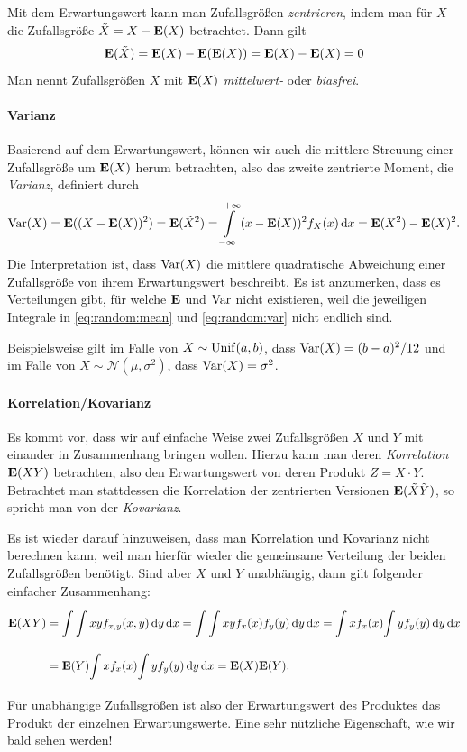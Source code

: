 Mit dem Erwartungswert kann man Zufallsgrößen \emph{zentrieren}, indem man für $X$ die Zufallsgröße $\tilde{X} = X - \bm{\mathrm{E}}(X)$ betrachtet. 
Dann gilt 
\[
\bm{\mathrm{E}}(\tilde{X}) = \bm{\mathrm{E}}(X) - \bm{\mathrm{E}}(\bm{\mathrm{E}}(X)) = \bm{\mathrm{E}}(X) - \bm{\mathrm{E}}(X) = 0
\]
Man nennt Zufallsgrößen $X$ mit $\bm{\mathrm{E}}(X)$ \emph{mittelwert-} oder \emph{biasfrei}.
%
%
\paragraph{Varianz}
%
Basierend auf dem Erwartungswert, können wir auch die mittlere Streuung einer Zufallsgröße um $\bm{\mathrm{E}}(X)$ herum betrachten, also das zweite zentrierte Moment, die \emph{Varianz}, definiert durch
%
\begin{equation}\label{eq:random:var}
\operatorname{Var}(X) 
    = \bm{\mathrm{E}}((X - \bm{\mathrm{E}}(X))^2) 
    = \bm{\mathrm{E}}(\tilde{X}^2)
    = {\int\limits_{-\infty}^{+\infty}{(x-\bm{\mathrm{E}}(X))^2 f_X(x)}\,\mathrm{d}{x}}
    = \bm{\mathrm{E}}(X^2) - \bm{\mathrm{E}}(X)^2.
\end{equation}
%
Die Interpretation ist, dass $\operatorname{Var}(X)$ die mittlere quadratische Abweichung einer Zufallsgröße von ihrem Erwartungswert beschreibt.
Es ist anzumerken, dass es Verteilungen gibt, für welche $\bm{\mathrm{E}}$ und $\operatorname{Var}$ nicht existieren, weil die jeweiligen Integrale in \eqref{eq:random:mean} und \eqref{eq:random:var} nicht endlich sind.

Beispielsweise gilt im Falle von $X \sim \operatorname{Unif}(a,b)$, dass $\operatorname{Var}(X) = (b-a)^2/12$ und im Falle von $X \sim \mathcal{N}(\mu, \sigma^2)$, dass $\operatorname{Var}(X) = \sigma^2$.
%
%
\paragraph{Korrelation/Kovarianz} 
Es kommt vor, dass wir auf einfache Weise zwei Zufallsgrößen $X$ und $Y$ mit einander in Zusammenhang bringen wollen.
Hierzu kann man deren \emph{Korrelation} $\bm{\mathrm{E}}(X Y)$ betrachten, also den Erwartungswert von deren Produkt $Z = X \cdot Y$.
Betrachtet man stattdessen die Korrelation der zentrierten Versionen $\bm{\mathrm{E}}(\tilde{X} \tilde{Y})$, so spricht man von der \emph{Kovarianz}.

Es ist wieder darauf hinzuweisen, dass man Korrelation und Kovarianz nicht  berechnen kann, weil man hierfür wieder die gemeinsame Verteilung der beiden Zufallsgrößen benötigt.
Sind aber $X$ und $Y$ unabhängig, dann gilt folgender einfacher Zusammenhang:
\begin{align*}
\bm{\mathrm{E}}(X Y) 
    & = {\int\limits_{}^{}{
        {\int\limits_{}^{}{x y f_{x,y}(x,y) }\,\mathrm{d}{y}}
    }\,\mathrm{d}{x}}
    = {\int\limits_{}^{}{
        {\int\limits_{}^{}{x y f_{x}(x) f_{y}(y) }\,\mathrm{d}{y}}
    }\,\mathrm{d}{x}}
    = {\int\limits_{}^{}{
        x f_x(x){\int\limits_{}^{}{y f_{y}(y) }\,\mathrm{d}{y}}
    }\,\mathrm{d}{x}} \\
    & = \bm{\mathrm{E}}(Y) {\int\limits_{}^{}{
        x f_x(x){\int\limits_{}^{}{y f_{y}(y) }\,\mathrm{d}{y}}
    }\,\mathrm{d}{x}}
    = \bm{\mathrm{E}}(X) \bm{\mathrm{E}}(Y).
\end{align*}
Für unabhängige Zufallsgrößen ist also der Erwartungswert des Produktes das Produkt der einzelnen Erwartungswerte. 
Eine sehr nützliche Eigenschaft, wie wir bald sehen werden!
%
%
